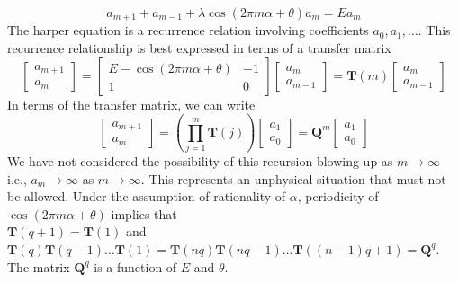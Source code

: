 \begin{equation}
 a_{m+1} + a_{m-1} + \lambda \cos(2\pi m \alpha + \theta)a_{m} = Ea_{m}
\end{equation}
The harper equation is a recurrence relation involving coefficients $a_{0}, a_{1}, \dots$. This recurrence relationship is best expressed in terms of a transfer matrix
\begin{equation}
 \left[ \begin{array}{c} a_{m+1} \\ a_{m} \end{array} \right] = \begin{bmatrix} E - \cos(2\pi m \alpha + \theta) & -1 \\ 1 & 0\end{bmatrix} \left[ \begin{array}{c} a_{m} \\ a_{m-1} \end{array} \right] = \mathbf{T}(m)\left[ \begin{array}{c} a_{m} \\ a_{m-1} \end{array} \right]
\end{equation} In terms of the transfer matrix, we can write
\begin{equation}
 \left[ \begin{array}{c} a_{m+1} \\ a_{m} \end{array} \right] = \left(\prod_{j=1}^{m}\mathbf{T}(j)\right)\left[ \begin{array}{c} a_{1} \\ a_{0} \end{array} \right] = \mathbf{Q}^m\left[ \begin{array}{c} a_{1} \\ a_{0} \end{array} \right]
\end{equation} We have not considered the possibility of this recursion blowing up as $m\rightarrow \infty$ i.e., $a_m \rightarrow \infty$ as $m\rightarrow\infty$. This represents an
unphysical situation that must not be allowed. Under the assumption of rationality of $\alpha$, periodicity of $\cos(2\pi m \alpha + \theta)$ implies that \\$\mathbf{T}(q+1) = \mathbf{T}(1)$ and 
$\mathbf{T}(q)\mathbf{T}(q-1)\dots\mathbf{T}(1) = \mathbf{T}(nq)\mathbf{T}(nq-1)\dots\mathbf{T}((n-1)q+1) = \mathbf{Q}^q$. The matrix $\mathbf{Q}^{q}$ is a function of $E$ and $\theta$.

